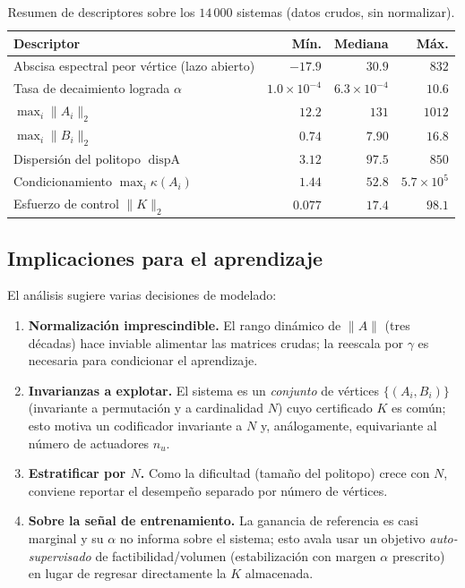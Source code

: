 \begin{table}[t]
  \centering
  \caption{Resumen de descriptores sobre los $14\,000$ sistemas (datos crudos,
  sin normalizar).}
  \label{tab:resumen}
  \begin{tabular}{lrrr}
    \toprule
    Descriptor & Mín. & Mediana & Máx. \\
    \midrule
    Abscisa espectral peor vértice (lazo abierto) & $-17.9$ & $30.9$ & $832$ \\
    Tasa de decaimiento lograda $\alpha$           & $1.0\times10^{-4}$ & $6.3\times10^{-4}$ & $10.6$ \\
    $\max_i\lVert A_i\rVert_2$                      & $12.2$ & $131$ & $1012$ \\
    $\max_i\lVert B_i\rVert_2$                      & $0.74$ & $7.90$ & $16.8$ \\
    Dispersión del politopo $\operatorname{dispA}$ & $3.12$ & $97.5$ & $850$ \\
    Condicionamiento $\max_i\kappa(A_i)$           & $1.44$ & $52.8$ & $5.7\times10^{5}$ \\
    Esfuerzo de control $\lVert K\rVert_2$         & $0.077$ & $17.4$ & $98.1$ \\
    \bottomrule
  \end{tabular}
\end{table}

\subsection{Implicaciones para el aprendizaje}

El análisis sugiere varias decisiones de modelado:
%
\begin{enumerate}
  \item \textbf{Normalización imprescindible.} El rango dinámico de $\lVert
        A\rVert$ (tres décadas) hace inviable alimentar las matrices crudas; la
        reescala por $\gamma$ es necesaria para condicionar el aprendizaje.
  \item \textbf{Invarianzas a explotar.} El sistema es un \emph{conjunto} de
        vértices $\{(A_i,B_i)\}$ (invariante a permutación y a cardinalidad
        $N$) cuyo certificado $K$ es común; esto motiva un codificador
        invariante a $N$ y, análogamente, equivariante al número de actuadores
        $n_u$.
  \item \textbf{Estratificar por $N$.} Como la dificultad (tamaño del politopo)
        crece con $N$, conviene reportar el desempeño separado por número de
        vértices.
  \item \textbf{Sobre la señal de entrenamiento.} La ganancia de referencia es
        casi marginal y su $\alpha$ no informa sobre el sistema; esto avala
        usar un objetivo \emph{auto-supervisado} de factibilidad/volumen
        (estabilización con margen $\alpha$ prescrito) en lugar de regresar
        directamente la $K$ almacenada.
\end{enumerate}

